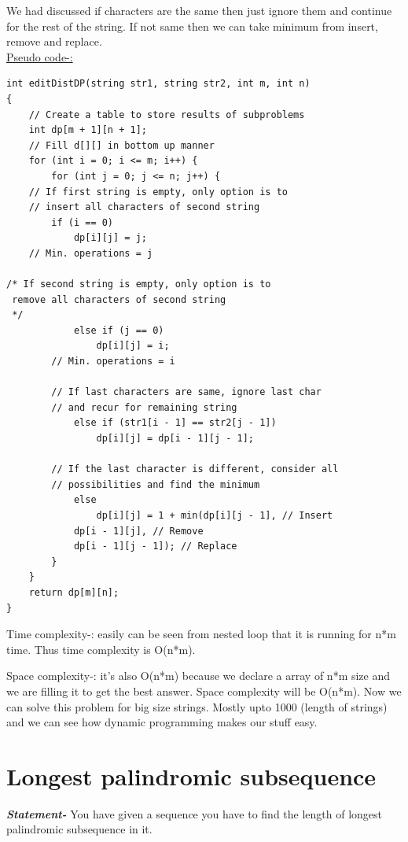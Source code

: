 \documentclass[12pt]{book}
\begin{document}
We had discussed if characters are the same then just ignore them and continue for the rest of the string. If not same then we can take minimum from insert, remove and replace.\\

\underline{Pseudo code-:}\\

\begin{lstlisting}
int editDistDP(string str1, string str2, int m, int n)
{
    // Create a table to store results of subproblems
    int dp[m + 1][n + 1];
    // Fill d[][] in bottom up manner
    for (int i = 0; i <= m; i++) {
        for (int j = 0; j <= n; j++) {
    // If first string is empty, only option is to
    // insert all characters of second string
        if (i == 0)
            dp[i][j] = j; 
    // Min. operations = j
  
/* If second string is empty, only option is to
 remove all characters of second string
 */
            else if (j == 0)
                dp[i][j] = i;
        // Min. operations = i
  
        // If last characters are same, ignore last char
        // and recur for remaining string
            else if (str1[i - 1] == str2[j - 1])
                dp[i][j] = dp[i - 1][j - 1];
 
        // If the last character is different, consider all
        // possibilities and find the minimum
            else
                dp[i][j] = 1 + min(dp[i][j - 1], // Insert
            dp[i - 1][j], // Remove
            dp[i - 1][j - 1]); // Replace
        }
    }
    return dp[m][n];
}
\end{lstlisting}

Time complexity-: easily can be seen from nested loop that it is running for n*m time. Thus time complexity is O(n*m).

Space complexity-: it’s also O(n*m) because we declare a array of n*m size and we are filling it to get the best answer.
Space complexity will be O(n*m).
Now we can solve this problem for big size strings. Mostly upto 1000 (length of strings) and we can see how dynamic programming makes our stuff easy.


\section{Longest palindromic subsequence}
\textbf{\textit{Statement-}}
                 You have given a sequence you have to find the length of longest palindromic subsequence in it.\\
\end{document}
